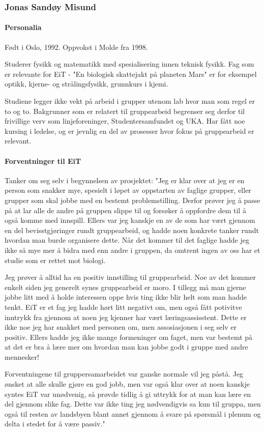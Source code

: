 \subsubsection{Jonas Sandøy Misund}

\paragraph{Personalia}
Født i Oslo, 1992.
Oppvokst i Molde fra 1998.

Studerer fysikk og matematikk med spesialisering innen teknisk fysikk.
Fag som er relevante for EiT - "En biologisk skattejakt på planeten Mars" er for eksempel optikk, kjerne- og strålingsfysikk, grunnkurs i kjemi.

Studiene legger ikke vekt på arbeid i grupper utenom lab hvor man som regel er to og to.
Bakgrunner som er relatert til gruppearbeid begrenser seg derfor til frivillige verv som linjeforeninger, Studentersamfundet og UKA.
Har fått noe kursing i ledelse, og er jevnlig en del av prosesser hvor fokus på gruppearbeid er relevant.

\paragraph{Forventninger til EiT}
Tanker om seg selv i begynnelsen av prosjektet:
"Jeg er klar over at jeg er en person som snakker mye, spesielt i løpet av oppstarten av faglige grupper, eller grupper som skal jobbe med en bestemt problemstilling.
Derfor prøver jeg å passe på at lar alle de andre på gruppen slippe til og forsøker å oppfordre dem til å også komme med innspill.
Ellers var jeg kanskje en av de som har vært gjennom en del bevisstgjøringer rundt gruppearbeid, og hadde noen konkrete tanker rundt hvordan man burde organisere dette.
Når det kommer til det faglige hadde jeg ikke så mye mer å bidra med enn andre i gruppen, da omtrent ingen av oss har et studie som er rettet mot biologi.

Jeg prøver å alltid ha en positiv innstilling til gruppearbeid.
Noe av det kommer enkelt siden jeg generelt synes gruppearbeid er moro.
I tillegg må man gjerne jobbe litt med å holde interessen oppe hvis ting ikke blir helt som man hadde tenkt.
EiT er et fag jeg hadde hørt litt negativt om, men også fått potivitve inntrykk fra gjennom at noen jeg kjenner har vært læringsassisstent.
Dette er ikke noe jeg har snakket med personen om, men assosiasjonen i seg selv er positiv.
Ellers hadde jeg ikke mange formeninger om faget, men var bestemt på at det er bra å lære mer om hvordan man kan jobbe godt i gruppe med andre mennesker!

Forventningene til gruppersamarbeidet var ganske normale vil jeg påstå.
Jeg ønsket at alle skulle gjøre en god jobb, men var også klar over at noen kanskje syntes EiT var unødvenig, så prøvde tidlig å gi uttrykk for at man kan lære en del gjennom slike fag.
Dette var ikke ting jeg nødvendigvis sa kun til gruppa, men også til resten av landsbyen blant annet gjennom å svare på spørsmål i plenum og delta i stedet for å være passiv."